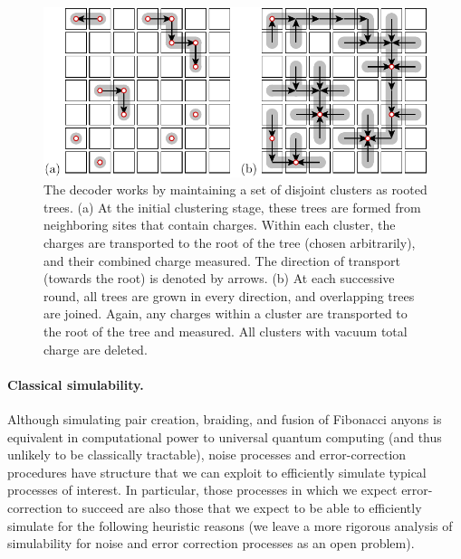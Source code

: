 \documentclass[aps, prl, letterpaper, twocolumn, superscriptaddress, notitlepage, 10pt]{revtex4}
\begin{document}
\begin{figure}[t!]
\begin{center}
	\includegraphics[width=1.0\columnwidth]{pic-decode.pdf}
\caption{The decoder works by maintaining a set of disjoint clusters as rooted trees.
(a) At the initial clustering stage, these trees are formed 
from neighboring sites that contain charges. Within each cluster, the 
charges are transported to the root of the tree (chosen 
arbitrarily), and their combined charge measured. The direction of transport 
(towards the root) is denoted by arrows.
(b) At each successive round, all trees are grown in 
every direction, and overlapping trees are joined. Again, any charges 
within a cluster are transported to the root of the 
tree and measured. All clusters with vacuum total charge are deleted.
\label{f:decode}
}
\end{center}
\vspace{-10pt}
\end{figure}

\paragraph{Classical simulability.}

Although simulating pair creation, braiding, and fusion of Fibonacci anyons is equivalent 
in computational power to universal quantum computing (and thus unlikely to be classically 
tractable), noise processes and error-correction procedures have structure that we can 
exploit to efficiently simulate typical processes of interest. In particular, those 
processes in which we expect error-correction to succeed are also those that we expect to 
be able to efficiently simulate for the following heuristic reasons 
(we leave a more rigorous analysis of simulability for noise 
and error correction processes as an open problem).
\end{document}
